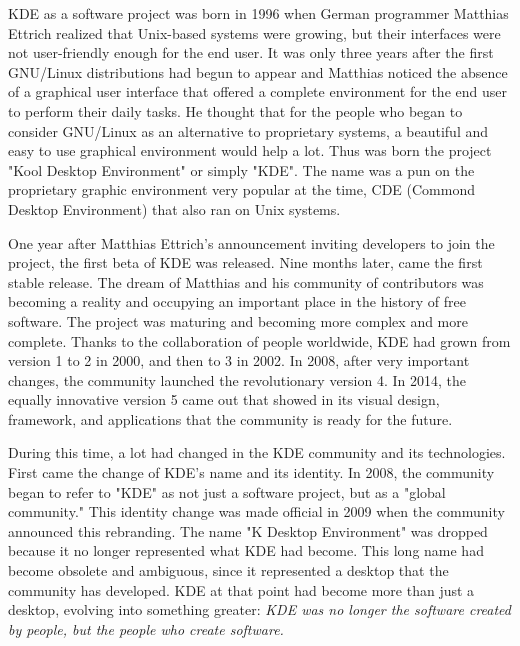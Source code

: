 

\noindent{}KDE as a software project was born in 1996 when German programmer Matthias Ettrich realized that Unix-based systems were growing, but their interfaces were not user-friendly enough for the end user. It was only three years after the first GNU/Linux distributions had begun to appear and Matthias noticed the absence of a graphical user interface that offered a complete environment for the end user to perform their daily tasks. He thought that for the people who began to consider GNU/Linux as an alternative to proprietary systems, a beautiful and easy to use graphical environment would help a lot. Thus was born the project "Kool Desktop Environment" or simply "KDE". The name was a pun on the proprietary graphic environment very popular at the time, CDE (Commond Desktop Environment) that also ran on Unix systems.

One year after Matthias Ettrich's announcement inviting developers to join the project, the first beta of KDE was released. Nine months later, came the first stable release. The dream of Matthias and his community of contributors was becoming a reality and occupying an important place in the history of free software. The project was maturing and becoming more complex and more complete. Thanks to the collaboration of people worldwide, KDE had grown from version 1 to 2 in 2000, and then to 3 in 2002. In 2008, after very important changes, the community launched the revolutionary version 4. In 2014, the equally innovative version 5 came out that showed in its visual design, framework, and applications that the community is ready for the future.

During this time, a lot had changed in the KDE community and its technologies. First came the change of KDE's name and its identity. In 2008, the community began to refer to "KDE" as not just a software project, but as a "global community." This identity change was made official in 2009 when the community announced this rebranding. The name "K Desktop Environment" was dropped because it no longer represented what KDE had become. This long name had become obsolete and ambiguous, since it represented a desktop that the community has developed. KDE at that point had become more than just a desktop, evolving into something greater: \textit{KDE was no longer the software created by people, but the people who create software.} 

